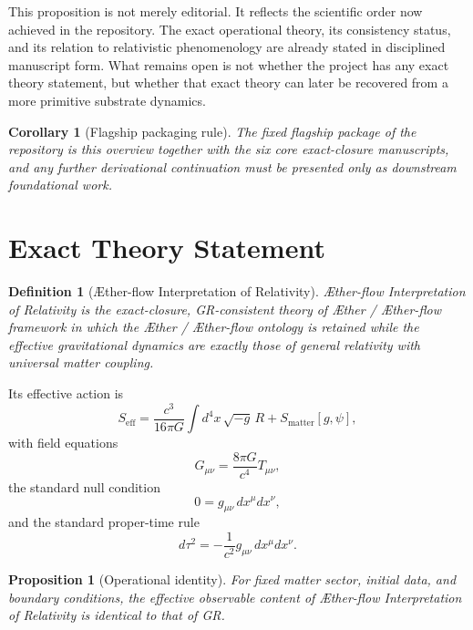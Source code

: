 \documentclass[11pt]{article}
\newcommand{\Aether}{\AE{}ther}
\newcommand{\Aflow}{\AE{}ther-flow}
\newcommand{\TheoryName}{\Aflow{} Interpretation of Relativity}
\newcommand{\TheoryProgram}{\Aether{} / \Aflow{} framework}
\newtheorem{definition}{Definition}
\newtheorem{proposition}{Proposition}
\newtheorem{corollary}{Corollary}
\begin{document}
This proposition is not merely editorial. It reflects the scientific order now achieved in the repository. The exact operational theory, its consistency status, and its relation to relativistic phenomenology are already stated in disciplined manuscript form. What remains open is not whether the project has any exact theory statement, but whether that exact theory can later be recovered from a more primitive substrate dynamics.

\begin{corollary}[Flagship packaging rule]
The fixed flagship package of the repository is this overview together with the six core exact-closure manuscripts, and any further derivational continuation must be presented only as downstream foundational work.
\end{corollary}

\section{Exact Theory Statement}

\begin{definition}[\TheoryName{}]
\TheoryName{} is the exact-closure, GR-consistent theory of \TheoryProgram{} in which the \Aether{} / \Aflow{} ontology is retained while the effective gravitational dynamics are exactly those of general relativity with universal matter coupling.
\end{definition}

Its effective action is
\begin{equation}
S_{\mathrm{eff}}
=
\frac{c^3}{16\pi G}\int d^4x\,\sqrt{-g}\,R
+
S_{\mathrm{matter}}[g,\psi],
\label{eq:SA}
\end{equation}
with field equations
\begin{equation}
G_{\mu\nu}
=
\frac{8\pi G}{c^4}T_{\mu\nu},
\label{eq:einstein}
\end{equation}
the standard null condition
\begin{equation}
0=g_{\mu\nu}\,dx^\mu dx^\nu,
\label{eq:null}
\end{equation}
and the standard proper-time rule
\begin{equation}
d\tau^2=-\frac{1}{c^2}g_{\mu\nu}\,dx^\mu dx^\nu.
\label{eq:propertime}
\end{equation}

\begin{proposition}[Operational identity]
For fixed matter sector, initial data, and boundary conditions, the effective observable content of \TheoryName{} is identical to that of GR.
\end{proposition}
\end{document}
